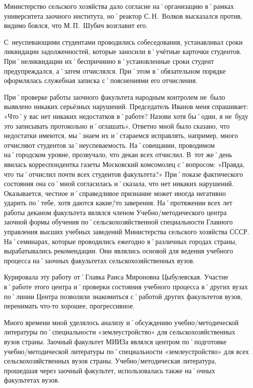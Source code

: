 Министерство сельского хозяйства дало согласие на˚организацию в˚рамках университета заочного института, но˚реактор С.\,Н.~Волков высказался против, видимо боялся, что М.\,П.~Шубич возглавит его.

С~неуспевающими студентами проводились собеседования, устанавливал сроки ликвидации задолженностей, которые заносили в˚учётные карточки студентов. При˚неликвидации их˚беспричинно в˚установленные сроки студент предупреждался, а˚затем отчислялся. При˚этом в˚обязательном порядке оформлялась служебная записка с˚пояснениями его отчисления.

При˚проверке работы заочного факультета народным контролем не~было выявлено никаких серьёзных нарушений. Председатель Иванов меня спрашивает: «Что˚у вас нет никаких недостатков в˚работе? Назови хотя бы˚один, я не~буду это записывать протокольно и˚оглашать». Ответно мной было сказано, что недостатки имеются, мы˚знаем их и˚стараемся исправлять, например, много отчисляют студентов за˚неуспеваемость. На˚совещании, проводимом на˚городском уровне, прозвучало, что декан всех отчислил. В~тот же˚день явилась корреспондентка газеты Московский комсомолец с˚вопросом: «Правда, что ты˚отчислил почти всех студентов факультета?» При˚показе фактического состояния она со˚мной согласилась и˚сказала, что нет никаких нарушений. Оказывается, честное и˚справедливое признание может иногда негативно ударить по˚тебе, хотя даются какие\=/то заверения. На˚протяжении всех лет работы деканом факультета являлся членом Учебно\-/методического центра заочной формы обучения по˚сельскохозяйственной специальности Главного управления высших учебных заведений Министерства сельского хозяйства СССР. На˚семинарах, которые проводились ежегодно в˚различных городах страны, вырабатывались рекомендации. Они являлись основой для ведения учебного процесса на˚заочных факультетах сельскохозяйственных вузов.

Курировала эту работу от˚Главка Раиса Мироновна Цыбулевская. Участие в˚работе этого центра и˚проверки состояния учебного процесса в˚других вузах по˚линии Центра позволяли знакомиться с˚работой других факультетов вузов, перенимать что-то хорошее, прогрессивное.

Много времени мной уделялось анализу и˚обсуждению учебно\-/методической литературы по˚специальности «землеустройство» для сельскохозяйственных вузов страны. Заочный факультет МИИЗа являлся центром по˚подготовке учебно\-/методической литературы по˚специальности «землеустройство» для всех сельскохозяйственных вузов страны. Учебно\-/методическая литература, прошедшая через заочный факультет, использовалась также на˚очных факультетах вузов.

